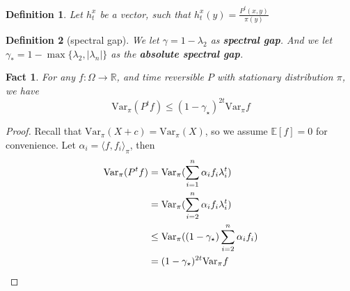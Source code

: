 \documentclass{article}
\newtheorem{define}{Definition}[section]
\newtheorem{fact}{Fact}[section]
\def\<{\langle}
\def\>{\rangle}
\begin{document}
\begin{define}
  Let $h_t^x$ be a vector, such that $h_t^x(y) = \frac{P^t(x,y)}{\pi(y)}$
\end{define}

\begin{define}[spectral gap]
  We let $\gamma = 1 - \lambda_2$ as \textbf{spectral gap}.
  And we let $\gamma_* = 1 - \max\{\lambda_2, |\lambda_n|\}$ as the \textbf{absolute spectral gap}.
\end{define}

\begin{fact} \label{fact:var-decay}
  For any $f: \Omega\to \mathbb{R}$, and time reversible $P$ with stationary distribution $\pi$, we have
  \[\mathrm{Var}_\pi (P^tf) \leq (1 - \gamma_\star)^{2t} \mathrm{Var}_\pi f\]
\end{fact}
\begin{proof}
  Recall that $\mathrm{Var}_\pi (X + c) = \mathrm{Var}_\pi(X)$, so we assume $\mathbb{E}[f] = 0$ for convenience.
  Let $\alpha_i = \<f, f_i\>_\pi$, then
  \begin{align*}
    \mathrm{Var}_\pi(P^tf)
    &= \mathrm{Var}_\pi (\sum_{i=1}^n \alpha_i f_i \lambda_i^t) \\
    &= \mathrm{Var}_\pi (\sum_{i=2}^n \alpha_i f_i \lambda_i^t) \\
    &\leq \mathrm{Var}_\pi ((1 - \gamma_\star) \sum_{i=2}^n \alpha_i f_i) \\
    &= (1 - \gamma_\star)^{2t} \mathrm{Var}_\pi f \qedhere
  \end{align*}
\end{proof}
\end{document}
